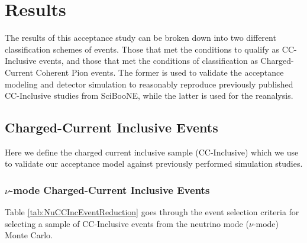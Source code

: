 \documentclass[11pt]{article}
\begin{document}
\section{Results}\label{sec:Results}
The results of this acceptance study can be broken down into two different classification schemes of events. Those that met the conditions to qualify as CC-Inclusive events, and those that met the conditions of classification as Charged-Current Coherent Pion events. The former is used to validate the acceptance modeling and detector simulation to reasonably reproduce previously published CC-Inclusive studies from SciBooNE, while the latter is used for the reanalysis.

\subsection{Charged-Current Inclusive Events}\label{sub:CCInclusive}

Here we define the charged current inclusive sample (CC-Inclusive) which we use to validate our acceptance model against previously performed simulation studies. 

\subsubsection{$\nu$-mode Charged-Current Inclusive Events}\label{sub:NuModeCCInclusive}
Table \ref*{tab:NuCCIncEventReduction} goes through the event selection criteria for selecting a sample of CC-Inclusive events from the neutrino mode ($\nu$-mode) Monte Carlo.
\end{document}
